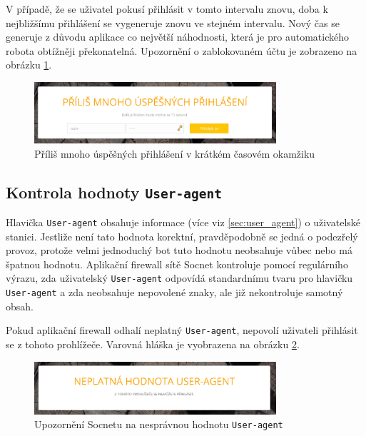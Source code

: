 V případě, že se uživatel pokusí přihlásit v tomto intervalu znovu, doba k nejbližšímu přihlášení se vygeneruje znovu ve stejném intervalu. Nový čas se generuje z důvodu aplikace co největší náhodnosti, která je pro automatického robota obtížněji překonatelná. Upozornění o zablokovaném účtu je zobrazeno na obrázku \ref{img:too_many_logins}.

\begin{figure}[H]
	\centering
	\includegraphics[width=0.8\textwidth]{images/too_many_logins.jpg}
	\caption{Příliš mnoho úspěšných přihlášení v krátkém časovém okamžiku}
	\label{img:too_many_logins}
\end{figure}

\subsection*{Kontrola hodnoty \texttt{User-agent}}
Hlavička \texttt{User-agent} obsahuje informace (více viz \ref{sec:user_agent}) o uživatelské stanici. Jestliže není tato hodnota korektní, pravděpodobně se jedná o podezřelý provoz, protože velmi jednoduchý bot tuto hodnotu neobsahuje vůbec nebo má špatnou hodnotu. Aplikační firewall sítě Socnet kontroluje pomocí regulárního výrazu, zda uživatelský \texttt{User-agent} odpovídá standardnímu tvaru pro hlavičku \texttt{User-agent} a zda neobsahuje nepovolené znaky, ale již nekontroluje samotný obsah.

Pokud aplikační firewall odhalí neplatný \texttt{User-agent}, nepovolí uživateli přihlásit se z tohoto prohlížeče. Varovná hláška je vyobrazena na obrázku \ref{img:bad_user_agent}.

\begin{figure}[H]
	\centering
	\includegraphics[width=0.8\textwidth]{images/bad_user_agent.jpg}
	\caption{Upozornění Socnetu na nesprávnou hodnotu \texttt{User-agent}}
	\label{img:bad_user_agent}
\end{figure}


